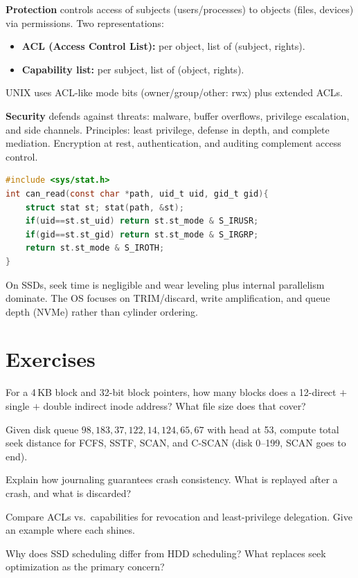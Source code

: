 \textbf{Protection} controls access of subjects (users/processes) to objects
(files, devices) via permissions. Two representations:

\begin{itemize}
  \item \textbf{ACL (Access Control List):} per object, list of (subject, rights).
  \item \textbf{Capability list:} per subject, list of (object, rights).
\end{itemize}
UNIX uses ACL-like mode bits (owner/group/other: rwx) plus extended ACLs.

\textbf{Security} defends against threats: malware, buffer overflows, privilege
escalation, and side channels. Principles: least privilege, defense in depth,
and complete mediation. Encryption at rest, authentication, and auditing
complement access control.

\begin{lstlisting}[language=C,caption={Checking UNIX permissions (sketch)}]
#include <sys/stat.h>
int can_read(const char *path, uid_t uid, gid_t gid){
    struct stat st; stat(path, &st);
    if(uid==st.st_uid) return st.st_mode & S_IRUSR;
    if(gid==st.st_gid) return st.st_mode & S_IRGRP;
    return st.st_mode & S_IROTH;
}
\end{lstlisting}

\begin{remark}
On SSDs, seek time is negligible and wear leveling plus internal parallelism
dominate. The OS focuses on TRIM/discard, write amplification, and queue depth
(NVMe) rather than cylinder ordering.
\end{remark}

\section{Exercises}
\label{sec:ch08-ex}
\begin{exercise}
For a 4\,KB block and 32-bit block pointers, how many blocks does a 12-direct
$+$ single $+$ double indirect inode address? What file size does that cover?
\end{exercise}
\begin{exercise}
Given disk queue $98,183,37,122,14,124,65,67$ with head at 53, compute total
seek distance for FCFS, SSTF, SCAN, and C-SCAN (disk 0--199, SCAN goes to end).
\end{exercise}
\begin{exercise}
Explain how journaling guarantees crash consistency. What is replayed after a
crash, and what is discarded?
\end{exercise}
\begin{exercise}
Compare ACLs vs.\ capabilities for revocation and least-privilege delegation.
Give an example where each shines.
\end{exercise}
\begin{exercise}
Why does SSD scheduling differ from HDD scheduling? What replaces seek
optimization as the primary concern?
\end{exercise}
